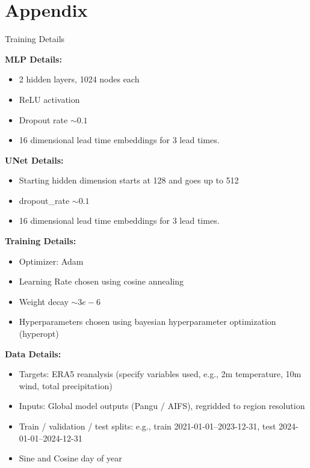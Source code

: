 \documentclass[aspectratio=169, xcolor=dvipsnames]{beamer}
\begin{document}
\section{Appendix}
\begin{frame}[allowframebreaks]{Training Details}
    \hypertarget{TrainingDetails}{} %

    \textbf{MLP Details:}
    \begin{itemize}
        \item 2 hidden layers, 1024 nodes each
        \item ReLU activation
        \item Dropout rate $\sim 0.1$
        \item 16 dimensional lead time embeddings for 3 lead times.
    \end{itemize}

    \textbf{UNet Details:}
    \begin{itemize}
        \item Starting hidden dimension starts at 128 and goes up to 512
        \item dropout\_rate $\sim 0.1$
        \item 16 dimensional lead time embeddings for 3 lead times.
    \end{itemize}

    \textbf{Training Details:}
    \begin{itemize}
        \item Optimizer: Adam
        \item Learning Rate chosen using cosine annealing
        \item Weight decay $\sim 3e-6$
        \item Hyperparameters chosen using bayesian hyperparameter optimization (hyperopt)
    \end{itemize}

    \textbf{Data Details:}
        \begin{itemize}
            \item Targets: ERA5 reanalysis (specify variables used, e.g., 2m temperature, 10m wind, total precipitation)
            \item Inputs: Global model outputs (Pangu / AIFS), regridded to region resolution
            \item Train / validation / test splits: e.g., train 2021-01-01--2023-12-31, test 2024-01-01--2024-12-31
            \item Sine and Cosine day of year
        \end{itemize}
        \hyperlink{FineTuning}{}
\end{frame}
\end{document}
